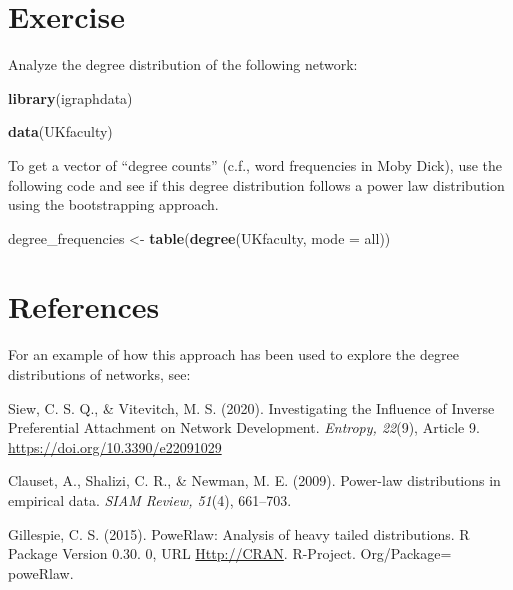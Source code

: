 \documentclass[
]{book}
\newenvironment{Shaded}{\begin{snugshade}}{\end{snugshade}}
\newcommand{\AttributeTok}[1]{\textcolor[rgb]{0.13,0.29,0.53}{#1}}
\newcommand{\FunctionTok}[1]{\textcolor[rgb]{0.13,0.29,0.53}{\textbf{#1}}}
\newcommand{\NormalTok}[1]{#1}
\newcommand{\OtherTok}[1]{\textcolor[rgb]{0.56,0.35,0.01}{#1}}
\newcommand{\StringTok}[1]{\textcolor[rgb]{0.31,0.60,0.02}{#1}}
\begin{document}
\section{Exercise}\label{exercise-12}

Analyze the degree distribution of the following network:

\begin{Shaded}
\begin{Highlighting}[]
\FunctionTok{library}\NormalTok{(igraphdata)}

\FunctionTok{data}\NormalTok{(}\StringTok{\textquotesingle{}UKfaculty\textquotesingle{}}\NormalTok{)}
\end{Highlighting}
\end{Shaded}

To get a vector of ``degree counts'' (c.f., word frequencies in Moby Dick), use the following code and see if this degree distribution follows a power law distribution using the bootstrapping approach.

\begin{Shaded}
\begin{Highlighting}[]
\NormalTok{degree\_frequencies }\OtherTok{\textless{}{-}} \FunctionTok{table}\NormalTok{(}\FunctionTok{degree}\NormalTok{(UKfaculty, }\AttributeTok{mode =} \StringTok{\textquotesingle{}all\textquotesingle{}}\NormalTok{))}
\end{Highlighting}
\end{Shaded}

\section{References}\label{references-3}

For an example of how this approach has been used to explore the degree distributions of networks, see:

Siew, C. S. Q., \& Vitevitch, M. S. (2020). Investigating the Influence of Inverse Preferential Attachment on Network Development. \emph{Entropy, 22}(9), Article 9. \url{https://doi.org/10.3390/e22091029}

Clauset, A., Shalizi, C. R., \& Newman, M. E. (2009). Power-law distributions in empirical data. \emph{SIAM Review, 51}(4), 661--703.

Gillespie, C. S. (2015). PoweRlaw: Analysis of heavy tailed distributions. R Package Version 0.30. 0, URL \url{Http://CRAN}. R-Project. Org/Package= poweRlaw.


\end{document}
